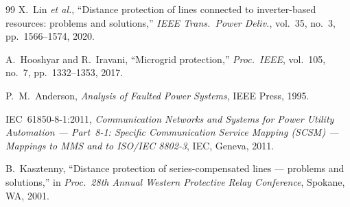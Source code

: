 \documentclass[11pt, a4paper]{article}
\begin{document}
\begin{thebibliography}{99}
X.~Lin \emph{et al.},
``Distance protection of lines connected to inverter-based resources:
  problems and solutions,''
\emph{IEEE Trans.\ Power Deliv.}, vol.~35, no.~3, pp.~1566--1574, 2020.

A.~Hooshyar and R.~Iravani,
``Microgrid protection,''
\emph{Proc.\ IEEE}, vol.~105, no.~7, pp.~1332--1353, 2017.

P.~M.~Anderson,
\emph{Analysis of Faulted Power Systems}, IEEE Press, 1995.

IEC~61850-8-1:2011, \emph{Communication Networks and Systems for Power Utility
Automation --- Part~8-1: Specific Communication Service Mapping (SCSM) ---
Mappings to MMS and to ISO/IEC 8802-3}, IEC, Geneva, 2011.

B.~Kasztenny,
``Distance protection of series-compensated lines --- problems and solutions,''
in \emph{Proc.\ 28th Annual Western Protective Relay Conference}, Spokane,
WA, 2001.
\end{thebibliography}
\end{document}
